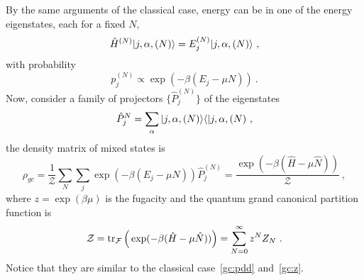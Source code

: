     By the same arguments of the classical case, energy can be in one of the energy eigenstates, each for a fixed $N$,
    \begin{equation*}
        \hat H^{(N)} \vert j, \alpha, (N)\rangle = E_j^{(N)} \vert j, \alpha, (N)\rangle ~,
    \end{equation*}
    with probability 
    \begin{equation}\label{prob2}
        p_j^{(N)} \propto \exp(- \beta (E_j - \mu N)) ~.
    \end{equation}
    Now, consider a family of projectors $\{\hat P_j^{(N)}\}$ of the eigenstates
    \begin{equation*}
        \hat P_j^{N} = \sum_\alpha \vert j, \alpha, (N)\rangle \langle\vert{j, \alpha, (N)} ~,
    \end{equation*}  
    the density matrix of mixed states is 
    \begin{equation*}
        \rho_{gc} = \frac{1}{\mathcal Z} \sum_N \sum_j \exp(- \beta (E_j - \mu N)) \hat P_j^{(N)} = \frac{\exp(- \beta (\hat H - \mu \hat N))}{\mathcal Z} ~,
    \end{equation*}
    where $z = \exp(\beta \mu)$ is the fugacity and the quantum grand canonical partition function is 
    \begin{equation}\label{qgc:z}
        \mathcal Z = \operatorname{tr}_{\mathcal F} \Big ( \exp(- \beta (\hat H - \mu \hat N)) \Big) = \sum_{N=0}^\infty z^N Z_N ~.
    \end{equation}
    Notice that they are similar to the classical case~\eqref{gc:pdd} and~\eqref{gc:z}.
